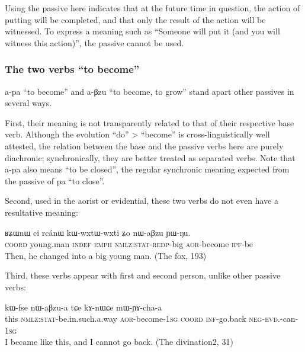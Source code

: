 \documentclass[oldfontcommands,oneside,a4paper,11pt]{memoir}
\newcommand{\ipa}[1]{{\phon #1}} %
\newcommand{\aor}{\textsc{aor}}
\newcommand{\coord}{\textsc{coord}}
\newcommand{\emphat}{\textsc{emph}}
\newcommand{\evd}{\textsc{evd}}
\newcommand{\indef}{\textsc{indef}}
\newcommand{\inftv}{\textsc{inf}}
\newcommand{\ipf}{\textsc{ipf}}
\newcommand{\negat}{\textsc{neg}}
\newcommand{\nmlz}{\textsc{nmlz}}
\newcommand{\redp}{\textsc{redp}}
\newcommand{\sg}{\textsc{sg}}
\newcommand{\stat}{\textsc{stat}}
\begin{document}
Using the passive here indicates that at the future time in question, the action of putting will be completed, and that only the result of the action will be witnessed. To express a meaning such as ``Someone will put it (and you will witness this action)'', the passive cannot be used.

\subsubsection{The two verbs ``to become''} \label{subsub:passive.become}
   \ipa{a-pa} ``to become'' and \ipa{a-βzu} ``to become, to grow''  stand apart other passives in several ways.
   
   First,  their meaning is not transparently related to that of their respective base verb. Although the evolution ``do'' > ``become'' is cross-linguistically well attested, the relation between the base and the passive verbs here are purely diachronic; synchronically, they are better treated as separated verbs. Note that \ipa{a-pa} also means ``to be closed'', the regular synchronic meaning expected from the passive of \ipa{pa} ``to close''.
   
   Second, used in the aorist or evidential, these two verbs do not even have a resultative meaning:

 
\begin{exe}
\ex
\gll     \ipa{tɕe} 	\ipa{ʁʑɯnɯ} 	\ipa{ci} 	\ipa{rcánɯ} 	\ipa{kɯ-wxtɯ-wxti} 	\ipa{ʑo} 	\ipa{nɯ-aβzu} 	\ipa{ɲɯ-ŋu.}        \\
       \coord{} young.man \indef{} \emphat{} \nmlz{}:\stat{}-\redp{}-big \empaht{} \aor{}-become \ipf{}-be        \\
 \glt    Then, he changed into a big young man. (The fox, 193)
\end{exe} 


Third, these verbs  appear with first and second person, unlike other passive verbs:

\begin{exe}
\ex
\gll  \ipa{ki} 	\ipa{kɯ-fse} 	\ipa{nɯ-aβzu-a} 	\ipa{tɕe} 	\ipa{kɤ-nɯɕe} 	\ipa{mɯ-ɲɤ-cha-a}        \\
          this \nmlz{}:\stat{}-be.in.such.a.way  \aor{}-become-1\sg{} \coord{} \inftv{}-go.back \negat{}-\evd{}.\perm{}-can-1\sg{}   \\
 \glt I became like this, and I cannot go back.   (The divination2, 31)
\end{exe} 
 
\end{document}
